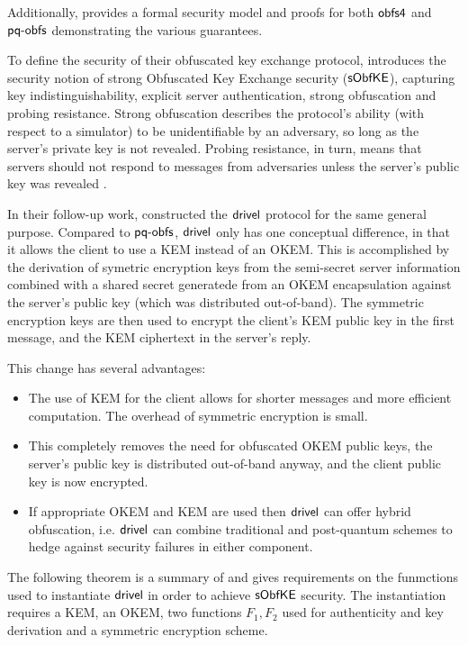 Additionally, \cite{CCS:GunSteVei24} provides a formal security model and proofs for both $\textsf{obfs4}$ and $\textsf{pq-obfs}$ demonstrating the various guarantees.

To define the security of their obfuscated key exchange protocol, \cite{CCS:GunSteVei24} introduces the security notion of strong Obfuscated Key Exchange security ($\mathsf{sObfKE}$), capturing key indistinguishability, explicit server authentication, strong obfuscation and probing resistance. Strong obfuscation describes the protocol's ability (with respect to a simulator) to be unidentifiable by an adversary, so long as the server's private key is not revealed. Probing resistance, in turn, means that servers should not respond to messages from adversaries unless the server's public key was revealed \cite[Section~4.1]{CCS:GunSteVei24}.

In their follow-up work, \cite{EPRINT:GRSV25} constructed the $\textsf{drivel}$ protocol for the same general purpose. Compared to $\textsf{pq-obfs}$, $\textsf{drivel}$ only has one conceptual difference, in that it allows the client to use a KEM instead of an OKEM.
This is accomplished by the derivation of symetric encryption keys from the semi-secret server information combined with a shared secret generatede from an OKEM encapsulation against the server's public key (which was distributed out-of-band).
The symmetric encryption keys are then used to encrypt the client's KEM public key in the first message, and the KEM ciphertext in the server's reply.

This change has several advantages:
\begin{itemize}
    \item The use of KEM for the client allows for shorter messages and more efficient computation. The overhead of symmetric encryption is small.
    \item This completely removes the need for obfuscated OKEM public keys, the server's public key is distributed out-of-band anyway, and the client public key is now encrypted.
    \item If appropriate OKEM and KEM are used then $\textsf{drivel}$ can offer hybrid obfuscation, i.e. $\textsf{drivel}$ can combine traditional and post-quantum schemes to hedge against security failures in either component.
\end{itemize}

The following theorem is a summary of \cite[Theorem~5]{EPRINT:GRSV25} and gives requirements on the funmctions used to instantiate $\textsf{drivel}$ in order to achieve $\mathsf{sObfKE}$ security. The instantiation requires a KEM, an OKEM, two functions $F_1, F_2$ used for authenticity and key derivation and a symmetric encryption scheme.


